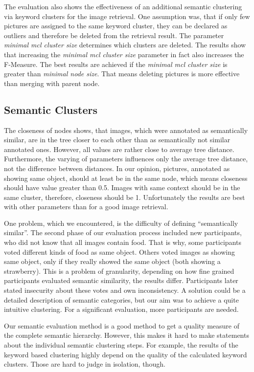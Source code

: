 \bigskip
The evaluation also shows the effectiveness of an additional semantic clustering via keyword clusters for the image retrieval. One assumption was, that if only few pictures are assigned to the same keyword cluster, they can be declared as outliers and therefore be deleted from the retrieval result. The parameter \emph{minimal mcl cluster size} determines which clusters are deleted. The results show that increasing the \emph{minimal mcl cluster size} parameter in fact also increases the F-Measure. The best results are achieved if the \emph{minimal mcl cluster size} is greater than \emph{minimal node size}. That means deleting pictures is more effective than merging with parent node.

\subsection{Semantic Clusters}	
The closeness of nodes shows, that images, which were annotated as semantically similar, are in the tree closer to each other than as semantically not similar annotated ones. However, all values are rather close to average tree distance. Furthermore, the varying of parameters influences only the average tree distance, not the difference between distances. In our opinion, pictures, annotated as showing same object, should at least be in the same node, which means closeness should have value greater than 0.5. Images with same context should be in the same cluster, therefore, closeness should be 1. Unfortunately the results are best with other parameters than for a good image retrieval.

\bigskip
One problem, which we encountered, is the difficulty of defining ``semantically similar''. The second phase of our evaluation process included new participants, who did not know that all images contain food. That is why, some participants voted different kinds of food as same object. Others voted images as showing same object, only if they really showed the same object (both showing a strawberry). This is a problem of granularity, depending on how fine grained participants evaluated semantic similarity, the results differ. Participants later stated insecurity about these votes and own inconsistency. A solution could be a detailed description of semantic categories, but our aim was to achieve a quite intuitive clustering. For a significant evaluation, more participants are needed.

\bigskip
Our semantic evaluation method is a good method to get a quality measure of the complete semantic hierarchy. However, this makes it hard to make statements about the individual semantic clustering steps. For example, the results of the keyword based clustering highly depend on the quality of the calculated keyword clusters. Those are hard to judge in isolation, though.\\	

